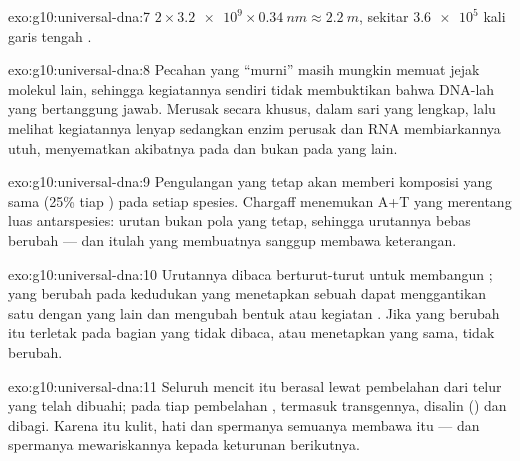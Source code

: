 \begin{solution}{exo:g10:universal-dna:7}
$2 \times \num{3.2e9} \times \qty{0.34}{nm} \approx \qty{2.2}{m}$,
sekitar $\num{3.6e5}$ kali garis tengah .
\end{solution}

\begin{solution}{exo:g10:universal-dna:8}
Pecahan yang ``murni'' masih mungkin memuat jejak molekul lain,
sehingga kegiatannya sendiri tidak membuktikan bahwa DNA-lah yang
bertanggung jawab. Merusak  secara khusus, dalam sari yang lengkap,
lalu melihat kegiatannya lenyap sedangkan enzim perusak  dan RNA
membiarkannya utuh, menyematkan akibatnya pada  dan bukan pada yang lain.
\end{solution}

\begin{solution}{exo:g10:universal-dna:9}
Pengulangan yang tetap akan memberi komposisi yang sama (25\% tiap
) pada setiap spesies. Chargaff menemukan A+T yang merentang luas
antarspesies: urutan  bukan pola yang tetap, sehingga urutannya
bebas berubah --- dan itulah yang membuatnya sanggup membawa keterangan.
\end{solution}

\begin{solution}{exo:g10:universal-dna:10}
Urutannya dibaca berturut-turut untuk membangun ;  yang
berubah pada kedudukan yang menetapkan sebuah  dapat
menggantikan satu  dengan yang lain dan mengubah bentuk atau
kegiatan . Jika  yang berubah itu terletak pada bagian
 yang tidak dibaca, atau menetapkan  yang sama,  tidak berubah.
\end{solution}

\begin{solution}{exo:g10:universal-dna:11}
Seluruh  mencit itu berasal lewat pembelahan dari  telur yang
telah dibuahi; pada tiap pembelahan , termasuk transgennya,
disalin () dan dibagi. Karena itu  kulit,  hati
dan  spermanya semuanya membawa  itu --- dan spermanya
mewariskannya kepada keturunan berikutnya.
\end{solution}

